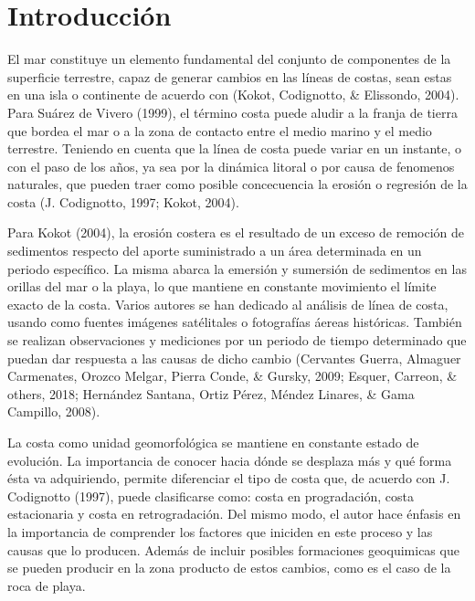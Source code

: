 \documentclass[11pt,]{article}
\begin{document}
\vskip 6.5pt


\noindent  \section{Introducción}\label{introducciuxf3n}

El mar constituye un elemento fundamental del conjunto de componentes de
la superficie terrestre, capaz de generar cambios en las líneas de
costas, sean estas en una isla o continente de acuerdo con (Kokot,
Codignotto, \& Elissondo, 2004). Para Suárez de Vivero (1999), el
término costa puede aludir a la franja de tierra que bordea el mar o a
la zona de contacto entre el medio marino y el medio terrestre. Teniendo
en cuenta que la línea de costa puede variar en un instante, o con el
paso de los años, ya sea por la dinámica litoral o por causa de
fenomenos naturales, que pueden traer como posible concecuencia la
erosión o regresión de la costa (J. Codignotto, 1997; Kokot, 2004).

Para Kokot (2004), la erosión costera es el resultado de un exceso de
remoción de sedimentos respecto del aporte suministrado a un área
determinada en un periodo específico. La misma abarca la emersión y
sumersión de sedimentos en las orillas del mar o la playa, lo que
mantiene en constante movimiento el límite exacto de la costa. Varios
autores se han dedicado al análisis de línea de costa, usando como
fuentes imágenes satélitales o fotografías áereas históricas. También se
realizan observaciones y mediciones por un periodo de tiempo determinado
que puedan dar respuesta a las causas de dicho cambio (Cervantes Guerra,
Almaguer Carmenates, Orozco Melgar, Pierra Conde, \& Gursky, 2009;
Esquer, Carreon, \& others, 2018; Hernández Santana, Ortiz Pérez, Méndez
Linares, \& Gama Campillo, 2008).

La costa como unidad geomorfológica se mantiene en constante estado de
evolución. La importancia de conocer hacia dónde se desplaza más y qué
forma ésta va adquiriendo, permite diferenciar el tipo de costa que, de
acuerdo con J. Codignotto (1997), puede clasificarse como: costa en
progradación, costa estacionaria y costa en retrogradación. Del mismo
modo, el autor hace énfasis en la importancia de comprender los factores
que iniciden en este proceso y las causas que lo producen. Además de
incluir posibles formaciones geoquimicas que se pueden producir en la
zona producto de estos cambios, como es el caso de la roca de playa.
\end{document}
